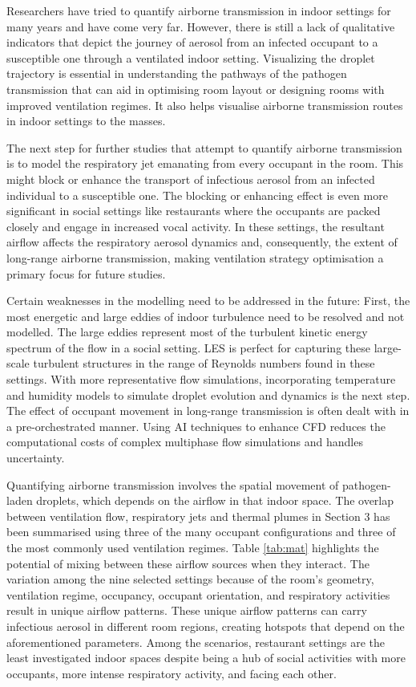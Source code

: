 \documentclass[a4paper,12pt]{elsarticle}
\begin{document}
Researchers have tried to quantify airborne transmission in indoor settings for many years and have come very far. However, there is still a lack of qualitative indicators that depict the journey of aerosol from an infected occupant to a susceptible one through a ventilated indoor setting. Visualizing the droplet trajectory is essential in understanding the pathways of the pathogen transmission that can aid in optimising room layout or designing rooms with improved ventilation regimes. It also helps visualise airborne transmission routes in indoor settings to the masses.

The next step for further studies that attempt to quantify airborne transmission is to model the respiratory jet emanating from every occupant in the room. This might block or enhance the transport of infectious aerosol from an infected individual to a susceptible one. The blocking or enhancing effect is even more significant in social settings like restaurants where the occupants are packed closely and engage in increased vocal activity. In these settings, the resultant airflow affects the respiratory aerosol dynamics and, consequently, the extent of long-range airborne transmission, making ventilation strategy optimisation a primary focus for future studies.

Certain weaknesses in the modelling need to be addressed in the future: First, the most energetic and large eddies of indoor turbulence need to be resolved and not modelled. The large eddies represent most of the turbulent kinetic energy spectrum of the flow in a social setting. LES is perfect for capturing these large-scale turbulent structures in the range of Reynolds numbers found in these settings. With more representative flow simulations, incorporating temperature and humidity models to simulate droplet evolution and dynamics is the next step. The effect of occupant movement in long-range transmission is often dealt with in a pre-orchestrated manner. Using AI techniques to enhance CFD reduces the computational costs of complex multiphase flow simulations and handles uncertainty.

Quantifying airborne transmission involves the spatial movement of pathogen-laden droplets, which depends on the airflow in that indoor space. The overlap between ventilation flow, respiratory jets and thermal plumes in Section 3 has been summarised using three of the many occupant configurations and three of the most commonly used ventilation regimes. Table \ref{tab:mat} highlights the potential of mixing between these airflow sources when they interact. The variation among the nine selected settings because of the room's geometry, ventilation regime, occupancy, occupant orientation, and respiratory activities result in unique airflow patterns. These unique airflow patterns can carry infectious aerosol in different room regions, creating hotspots that depend on the aforementioned parameters. Among the scenarios, restaurant settings are the least investigated indoor spaces despite being a hub of social activities with more occupants, more intense respiratory activity, and facing each other.
\end{document}
